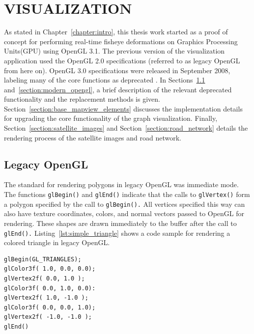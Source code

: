
 
\chapter{VISUALIZATION}
\label{chapter:visualization}
As stated in Chapter~\ref{chapter:intro}, this thesis work started as a proof of concept for performing
real-time fisheye deformations on Graphics Processing Units(GPU) using OpenGL 3.1. The previous version of the visualization application used the OpenGL 2.0 specifications (referred to as legacy OpenGL from here on). OpenGL 3.0 specifications were released in September 2008, labeling many of the core functions as deprecated \cite{opengl_3_specification}. In Sections~\ref{section:legacy_opengl} and~\ref{section:modern_opengl}, a brief description of the relevant deprecated
functionality and the replacement methods is given. Section~\ref{section:base_mapview_elements} discusses the implementation details for upgrading the core functionality of the graph visualization. Finally, Section~\ref{section:satellite_images} and Section~\ref{section:road_network} details the rendering process of the satellite images and road network.

\section{Legacy OpenGL}
\label{section:legacy_opengl}

The standard for rendering polygons in legacy OpenGL was immediate mode. The functions {\tt glBegin()} 
and {\tt glEnd()} indicate that the calls to {\tt glVertex()} form a polygon specified by the call to {\tt glBegin().} 
All vertices specified this way can also have texture coordinates, colors, and normal vectors 
passed to OpenGL for rendering. These shapes are drawn immediately to the buffer after the 
call to {\tt glEnd().} Listing~\ref{lst:simple_triangle} shows a code sample for rendering a colored triangle in legacy OpenGL. 

\begin{lstlisting}[float, 
    caption={[Legacy OpenGL Colored Triangle] Rendering a triangle with a red, blue, and green corner.},
    label={lst:simple_triangle}]
glBegin(GL_TRIANGLES);
glColor3f( 1.0, 0.0, 0.0);
glVertex2f( 0.0, 1.0 );
glColor3f( 0.0, 1.0, 0.0):
glVertex2f( 1.0, -1.0 );
glColor3f( 0.0, 0.0, 1.0);
glVertex2f( -1.0, -1.0 );
glEnd()
\end{lstlisting}

